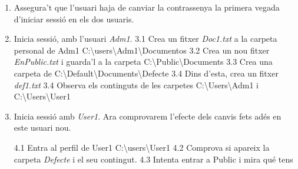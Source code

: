 \documentclass[
  a4paper,
]{article}
\begin{document}
\begin{enumerate}
\def\labelenumi{\arabic{enumi}.}
\setcounter{enumi}{1}
\item
  Assegura't que l'usuari haja de canviar la contrassenya la primera
  vegada d'iniciar sessió en els dos usuaris.
\item
  Inicia sessió, amb l'usuari \emph{Adm1}. 3.1 Crea un fitxer
  \emph{Doc1.txt} a la carpeta personal de Adm1
  C:\textbackslash users\textbackslash Adm1\textbackslash Documentos 3.2
  Crea un nou fitxer \emph{EnPublic.txt} i guarda'l a la carpeta
  C:\textbackslash Public\textbackslash Documents 3.3 Crea una carpeta
  de
  C:\textbackslash Default\textbackslash Documents\textbackslash Defecte
  3.4 Dins d'esta, crea un fitxer \emph{def1.txt} 3.4 Observa els
  continguts de les carpetes C:\textbackslash Users\textbackslash Adm1 i
  C:\textbackslash Users\textbackslash User1
\item
  Inicia sessió amb \emph{User1}. Ara comprovarem l'efecte dels canvis
  fets adés en este usuari nou.

  4.1 Entra al perfil de User1
  C:\textbackslash users\textbackslash User1 4.2 Comprova si apareix la
  carpeta \emph{Defecte} i el seu contingut. 4.3 Intenta entrar a Public
  i mira qué tens
\end{enumerate}
\end{document}
